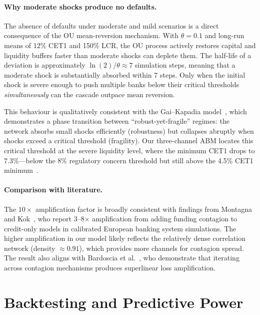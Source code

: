 \paragraph{Why moderate shocks produce no defaults.}
The absence of defaults under moderate and mild scenarios is a direct consequence of the OU mean-reversion mechanism. With $\theta = 0.1$ and long-run means of 12\% CET1 and 150\% LCR, the OU process actively restores capital and liquidity buffers faster than moderate shocks can deplete them. The half-life of a deviation is approximately $\ln(2)/\theta \approx 7$ simulation steps, meaning that a moderate shock is substantially absorbed within 7 steps. Only when the initial shock is severe enough to push multiple banks below their critical thresholds \emph{simultaneously} can the cascade outpace mean reversion.

This behaviour is qualitatively consistent with the Gai--Kapadia model~\cite{gai2010contagion}, which demonstrates a phase transition between ``robust-yet-fragile'' regimes: the network absorbs small shocks efficiently (robustness) but collapses abruptly when shocks exceed a critical threshold (fragility). Our three-channel ABM locates this critical threshold at the severe liquidity level, where the minimum CET1 drops to 7.3\%---below the 8\% regulatory concern threshold but still above the 4.5\% CET1 minimum~\cite{drehmann2013model,borio2011macroprudential}.

\paragraph{Comparison with literature.}
The $10\times$ amplification factor is broadly consistent with findings from Montagna and Kok~\cite{montagna2016multi}, who report 3--8$\times$ amplification from adding funding contagion to credit-only models in calibrated European banking system simulations. The higher amplification in our model likely reflects the relatively dense correlation network (density $\approx 0.91$), which provides more channels for contagion spread. The result also aligns with Bardoscia et al.~\cite{bardoscia2017distress}, who demonstrate that iterating across contagion mechanisms produces superlinear loss amplification.


\section{Backtesting and Predictive Power}
\label{sec:backtesting}

